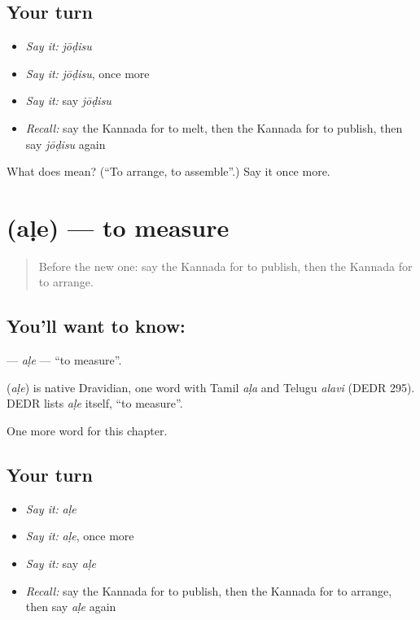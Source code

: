 \subsection*{Your turn}
\begin{itemize}
\raggedright
  \item \emph{Say it:} \emph{jōḍisu}
  \item \emph{Say it:} \emph{jōḍisu}, once more
  \item \emph{Say it:} say \emph{jōḍisu}
  \item \emph{Recall:} say the Kannada for to melt, then the Kannada for to publish, then say \emph{jōḍisu} again
\end{itemize}

\begin{tcolorbox}[breakable,colback=teal!4,colframe=teal!35!black,title={Before you move on}]
What does  mean? (\textquotedblleft{}To arrange, to assemble\textquotedblright{}.) Say it once more.
\end{tcolorbox}
\section[\texorpdfstring{\kn{ಅಳೆ} (aḷe)}{ಅಳೆ (aḷe)}]{ (aḷe) — to measure}

\label{lesson:KA-C204-ale}



\begin{quote}
Before the new one: say the Kannada for to publish, then the Kannada for to arrange.
\end{quote}

\subsection*{You'll want to know: }
\textbf{} — \emph{aḷe} — \textquotedblleft{}to measure\textquotedblright{}.

\begin{cousinweb}
\textbf{} (\emph{aḷe}) is native Dravidian, one word with Tamil \emph{aḷa} and Telugu \emph{alavi} (DEDR 295). DEDR lists \emph{aḷe} itself, \textquotedblleft{}to measure\textquotedblright{}.
\end{cousinweb}

\begin{grammarlens}[title={What you've built}]
One more word for this chapter.
\end{grammarlens}

\subsection*{Your turn}
\begin{itemize}
\raggedright
  \item \emph{Say it:} \emph{aḷe}
  \item \emph{Say it:} \emph{aḷe}, once more
  \item \emph{Say it:} say \emph{aḷe}
  \item \emph{Recall:} say the Kannada for to publish, then the Kannada for to arrange, then say \emph{aḷe} again
\end{itemize}

